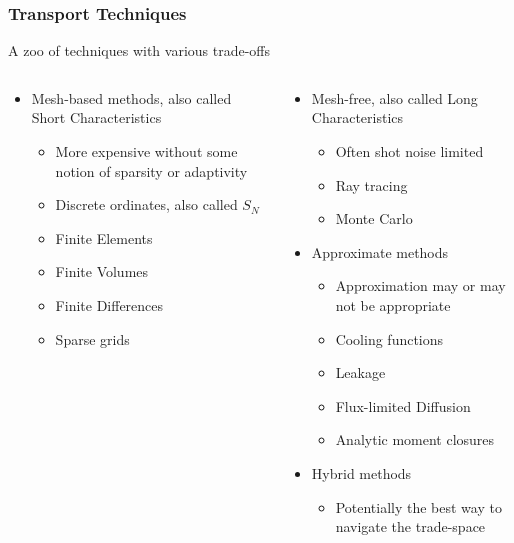 \documentclass[]{beamer}
\begin{document}
\begin{frame}
  \frametitle{Transport Techniques}
  A zoo of techniques with various trade-offs
  \begin{columns}
    \begin{column}{6cm}
      \begin{itemize}
      \item Mesh-based methods, also called Short Characteristics
        \begin{itemize}
        \item {\color{red}More expensive without some notion of sparsity or adaptivity}
        \item Discrete ordinates, also called $S_N$
        \item Finite Elements
        \item Finite Volumes
        \item Finite Differences
        \item Sparse grids
        \end{itemize}
      \end{itemize}
    \end{column}
    \begin{column}{6cm}
      \begin{itemize}
        \item Mesh-free, also called Long Characteristics
          \begin{itemize}
          \item {\color{red}Often shot noise limited}
          \item Ray tracing
          \item Monte Carlo
          \end{itemize}
      \item Approximate methods
        \begin{itemize}
        \item {\color{red}Approximation may or may not be appropriate}
        \item Cooling functions
        \item Leakage
        \item Flux-limited Diffusion
        \item Analytic moment closures
        \end{itemize}
      \item Hybrid methods
        \begin{itemize}
        \item {\color{red}Potentially the best way to navigate the trade-space}
        \end{itemize}
      \end{itemize}
    \end{column}
  \end{columns}
\end{frame}
\end{document}
